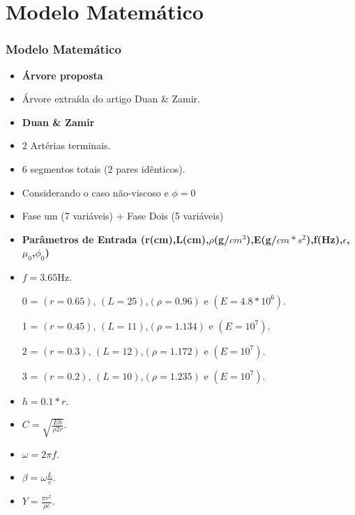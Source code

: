 \documentclass[10pt]{beamer}
\theoremstyle{remark}
\theoremstyle{definition}
\begin{document}
	\section{Modelo Matemático}
	\begin{frame}[allowframebreaks]
		\frametitle{Modelo Matemático}
		
		\begin{itemize}
			\item \textbf{Árvore proposta}
			\item Árvore extraída do artigo Duan \& Zamir.
			
		\end{itemize}
		
		\framebreak
		
		\begin{itemize}
			\item \textbf{Duan \& Zamir}
			\item 2 Artérias terminais.
			\item 6 segmentos totais (2 pares idênticos).
			\item Considerando o caso não-viscoso e  $\phi = 0$
			\item Fase um (7 variáveis) + Fase Dois (5 variáveis)
			
		\end{itemize}
		
		\framebreak
		
		\begin{itemize}
			\item \textbf{Parâmetros de Entrada (r(cm),L(cm),$\rho$(g/$cm^3$),E(g/$cm*s^2$),f(Hz),$\epsilon$,$\mu_0$,$\phi_0$)}
			\item $ f =3.65$Hz.
			\item [0] = $(r = 0.65)$, $(L = 25)$,$(\rho = 0.96)$ e $(E = 4.8 * 10^6)$.
			\item [1] = $(r = 0.45)$, $(L = 11)$,$(\rho = 1.134)$ e $(E = 10^7)$.
			\item [2] = $(r = 0.3)$, $(L = 12)$,$(\rho = 1.172)$ e $(E = 10^7)$.
			\item [3] = $(r = 0.2)$, $(L = 10)$,$(\rho = 1.235)$ e $(E = 10^7)$.
			
		\end{itemize}
		
		\framebreak
		
		\begin{itemize}
			\item $ h = 0.1 * r $.
			\item $ C = \sqrt{\frac{Eh}{\rho 2 r}}$.
			\item $ \omega = 2 \pi f$.
			\item $ \beta = \omega \frac{L}{c}$.
			\item $ Y = \frac{\pi r^2}{\rho c}$.
			

\end{itemize}
\end{frame}
\end{document}
